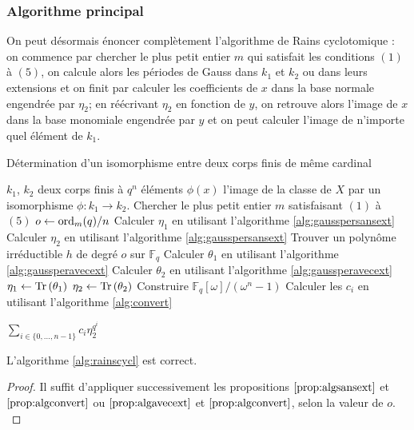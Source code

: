 \documentclass[a4paper]{article} %
\numberwithin{section}{part}
\numberwithin{equation}{section}
\newcommand\GF[1]{\mathbb{F}_{#1}}
\newcommand\Tr[1]{\textup{Tr}\left(#1\right)}
\newcommand\ord[2]{\textup{ord}_{#1}(#2)}
\begin{document}
\subsubsection*{Algorithme principal}

On peut désormais énoncer complètement l'algorithme de Rains cyclotomique : on
commence par chercher le plus petit entier $m$ qui satisfait les conditions
$(1)$ à $(5)$, on calcule alors les périodes de Gauss dans $k_1$ et $k_2$ ou
dans leurs extensions et on finit par calculer les coefficients de $x$ dans la
base normale engendrée par $\eta_2$; en réécrivant $\eta_2$ en fonction de $y$,
on retrouve alors l'image de $x$ dans la base monomiale engendrée par $y$ et on
peut calculer l'image de n'importe quel élément de $k_1$.

\begin{algorithm}
\caption{Détermination d'un isomorphisme entre deux corps finis de même
cardinal}
\label{alg:rainscycl}
\begin{algorithmic}[1]
\REQUIRE $k_1$, $k_2$ deux corps finis à $q^n$ éléments
\ENSURE $\phi(x)$ l'image de la classe de $X$ par un isomorphisme $\phi : k_1
\to k_2$. 
\bigskip
\STATE Chercher le plus petit entier $m$ satisfaisant $(1)$ à $(5)$
\STATE $o \leftarrow \ord{m}{q}/n$
    \STATE Calculer $\eta_1$ en utilisant l'algorithme \ref{alg:gausspersansext}
    \STATE Calculer $\eta_2$ en utilisant l'algorithme \ref{alg:gausspersansext}
\ELSE
    \STATE Trouver un polynôme irréductible $h$ de degré $o$ sur $\GF{q}$
    \STATE Calculer $\theta_1$ en utilisant l'algorithme 
    \ref{alg:gaussperavecext}
    \STATE Calculer $\theta_2$ en utilisant l'algorithme 
    \ref{alg:gaussperavecext}
    \STATE $\eta_1 \leftarrow \Tr{\theta_1}$
    \STATE $\eta_2 \leftarrow \Tr{\theta_2}$
\ENDIF
\STATE Construire $\GF{q}[\omega]/(\omega^n - 1)$
\STATE Calculer les $c_i$ en utilisant l'algorithme \ref{alg:convert}

\RETURN $\sum_{i\in\lbrace{0,\dots,n-1}\rbrace}{c_i\eta_2^{q^i}}$

\end{algorithmic}
\end{algorithm}

\begin{prop}
L'algorithme \ref{alg:rainscycl} est correct.
\end{prop}
\begin{proof}
Il suffit d'appliquer successivement les propositions $\ref{prop:algsansext}$ et
$\ref{prop:algconvert}$ ou $\ref{prop:algavecext}$ et $\ref{prop:algconvert}$,
selon la valeur de $o$.\\
\end{proof}
\end{document}

